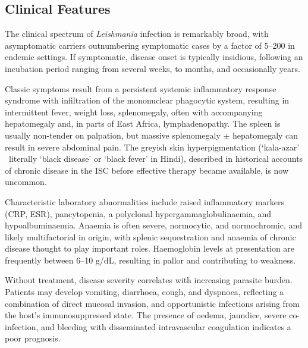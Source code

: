 
\subsection{Clinical Features}

The clinical spectrum of \textit{Leishmania} infection is remarkably broad, with asymptomatic carriers outnumbering symptomatic cases by a factor of 5--200 in endemic settings\cite{pederiva2022,burza2018,werneck2002}. If symptomatic, disease onset is typically insidious, following an incubation period ranging from several weeks, to months, and occasionally years\cite{ready2014}.

Classic symptoms result from a persistent systemic inflammatory response syndrome with infiltration of the mononuclear phagocytic system, resulting in intermittent fever, weight loss, splenomegaly, often with accompanying hepatomegaly and, in parts of East Africa, lymphadenopathy.  The spleen is usually non-tender on palpation, but massive splenomegaly $\pm$ hepatomegaly can result in severe abdominal pain. The greyish skin hyperpigmentation (`kala-azar' \textemdash\  literally `black disease' or `black fever' in Hindi), described in historical accounts of chronic disease in the ISC before effective therapy became available, is now uncommon\cite{chappuis2007, farrar2023manson}.

Characteristic laboratory abnormalities include raised inflammatory markers (CRP, ESR), pancytopenia, a polyclonal hypergammaglobulinaemia, and hypoalbuminaemia. Anaemia is often severe, normocytic, and normochromic, and likely multifactorial in origin, with splenic sequestration and anaemia of chronic disease thought to play important roles\cite{varma2010,goto2017}. Haemoglobin levels at presentation are frequently between 6--10 g/dL\cite{varma2010}, resulting in pallor and contributing to weakness.

Without treatment, disease severity correlates with increasing parasite burden\cite{zacarias2017,silva2014}. Patients may develop vomiting, diarrhoea, cough, and dyspnoea, reflecting a combination of direct mucosal invasion, and opportunistic infections arising from the host's immunosuppressed state. The presence of oedema, jaundice, severe co-infection, and bleeding with disseminated intravascular coagulation indicates a poor prognosis\cite{costa2023}.

